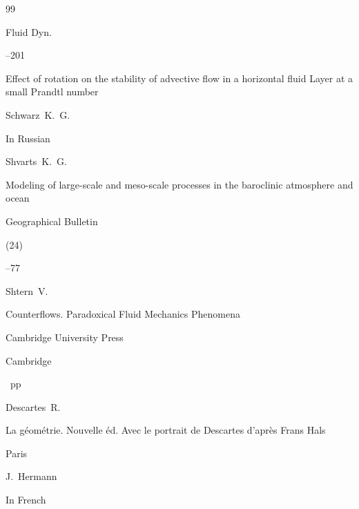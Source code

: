 \begin{thebibliography}{99}





\jour Fluid Dyn.




–201 

\paper Effect of rotation on the stability of advective flow in a horizontal fluid Layer at a small Prandtl number

\by Schwarz~K.~G.






\lang In Russian

\by Shvarts~K.~G.

\paper Modeling of large-scale and meso-scale processes in the baroclinic atmosphere and ocean

\jour Geographical Bulletin


(24)

--77






\by Shtern~V.

\book Counterflows. Paradoxical Fluid Mechanics Phenomena

\publ Cambridge University Press

\publaddr  Cambridge 


~pp \nofrills





\by Descartes~R.

\book La g\'eom\'etrie. Nouvelle \'ed. Avec le portrait de Descartes d'apr\`es Frans Hals


\publaddr Paris

\publ J.~Hermann



\lang In French







\end{thebibliography}



\renewcommand{\baselinestretch}{0.9}





%

